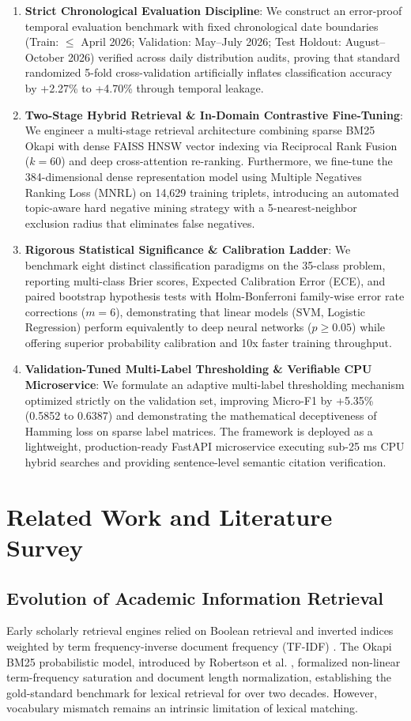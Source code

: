 \documentclass[journal]{IEEEtran}
\begin{document}
\begin{enumerate}
    \item \textbf{Strict Chronological Evaluation Discipline}: We construct an error-proof temporal evaluation benchmark with fixed chronological date boundaries (Train: $\le$ April 2026; Validation: May--July 2026; Test Holdout: August--October 2026) verified across daily distribution audits, proving that standard randomized 5-fold cross-validation artificially inflates classification accuracy by +2.27\% to +4.70\% through temporal leakage.
    \item \textbf{Two-Stage Hybrid Retrieval \& In-Domain Contrastive Fine-Tuning}: We engineer a multi-stage retrieval architecture combining sparse BM25 Okapi with dense FAISS HNSW vector indexing via Reciprocal Rank Fusion ($k=60$) and deep cross-attention re-ranking. Furthermore, we fine-tune the 384-dimensional dense representation model using Multiple Negatives Ranking Loss (MNRL) on 14,629 training triplets, introducing an automated topic-aware hard negative mining strategy with a 5-nearest-neighbor exclusion radius that eliminates false negatives.
    \item \textbf{Rigorous Statistical Significance \& Calibration Ladder}: We benchmark eight distinct classification paradigms on the 35-class problem, reporting multi-class Brier scores, Expected Calibration Error (ECE), and paired bootstrap hypothesis tests with Holm-Bonferroni family-wise error rate corrections ($m=6$), demonstrating that linear models (SVM, Logistic Regression) perform equivalently to deep neural networks ($p \ge 0.05$) while offering superior probability calibration and 10x faster training throughput.
    \item \textbf{Validation-Tuned Multi-Label Thresholding \& Verifiable CPU Microservice}: We formulate an adaptive multi-label thresholding mechanism optimized strictly on the validation set, improving Micro-F1 by +5.35\% (0.5852 to 0.6387) and demonstrating the mathematical deceptiveness of Hamming loss on sparse label matrices. The framework is deployed as a lightweight, production-ready FastAPI microservice executing sub-25 ms CPU hybrid searches and providing sentence-level semantic citation verification.
\end{enumerate}

\section{Related Work and Literature Survey}
\subsection{Evolution of Academic Information Retrieval}
Early scholarly retrieval engines relied on Boolean retrieval and inverted indices weighted by term frequency-inverse document frequency (TF-IDF) \cite{salton1988term}. The Okapi BM25 probabilistic model, introduced by Robertson et al. \cite{robertson2009probabilistic}, formalized non-linear term-frequency saturation and document length normalization, establishing the gold-standard benchmark for lexical retrieval for over two decades. However, vocabulary mismatch remains an intrinsic limitation of lexical matching.
\end{document}
